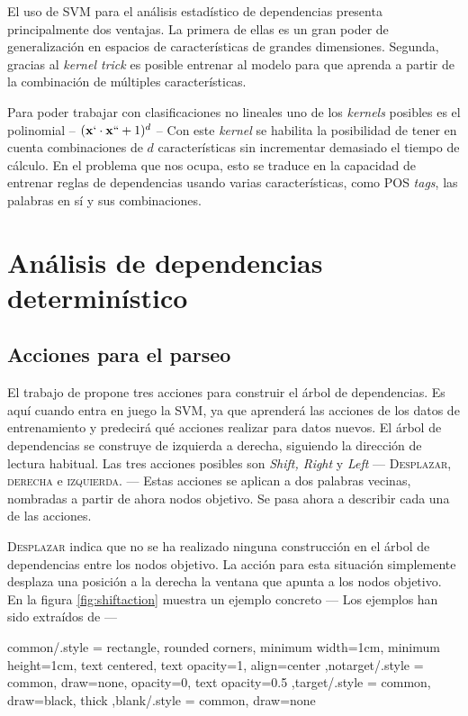 El uso de \ac{SVM} para el análisis estadístico de dependencias presenta
principalmente dos ventajas. La primera de ellas es un gran poder de
generalización en espacios de características de grandes dimensiones. Segunda,
gracias al \emph{kernel trick} es posible entrenar al modelo para que aprenda a
partir de la combinación de múltiples características.

Para poder trabajar con clasificaciones no lineales uno de los \emph{kernels}
posibles es el polinomial -- $(\mathbf{x}` \cdot \mathbf{x}`` + 1)^d$ -- Con
este \emph{kernel} se habilita la posibilidad de tener en cuenta combinaciones
de $d$ características sin incrementar demasiado el tiempo de cálculo. En el
problema que nos ocupa, esto se traduce en la capacidad de entrenar reglas de
dependencias usando varias características, como \ac{POS} \emph{tags}, las
palabras en sí y sus combinaciones.

\section{Análisis de dependencias determinístico}
\label{sec:depanalysis}

\subsection{Acciones para el parseo}
\label{subsec:parseractions}

El trabajo de \citeauthor{yamada2003} propone tres acciones para construir el
árbol de dependencias. Es aquí cuando entra en juego la \ac{SVM}, ya que
aprenderá las acciones de los datos de entrenamiento y predecirá qué acciones
realizar para datos nuevos. El árbol de dependencias se construye de izquierda a
derecha, siguiendo la dirección de lectura habitual. Las tres acciones
posibles son \emph{Shift, Right} y \emph{Left} --- \textsc{Desplazar, derecha} e
\textsc{izquierda}. --- Estas acciones se aplican a dos palabras vecinas, nombradas a
partir de ahora nodos objetivo. Se pasa ahora a describir cada una de las
acciones.

\textsc{Desplazar} indica que no se ha realizado ninguna construcción en el
árbol de dependencias entre los nodos objetivo. La acción para esta situación
simplemente desplaza una posición a la derecha la ventana que apunta a los nodos
objetivo. En la figura \autoref{fig:shiftaction} muestra un ejemplo concreto ---
Los ejemplos han sido extraídos de \citet{yamada2003} ---

\tikzset
  {common/.style =
    {rectangle, rounded corners, minimum width=1cm, minimum height=1cm,
     text centered, text opacity=1, align=center
    }
  ,notarget/.style = {common, draw=none, opacity=0, text opacity=0.5}
  ,target/.style   = {common, draw=black, thick}
  ,blank/.style    = {common, draw=none}
  }

